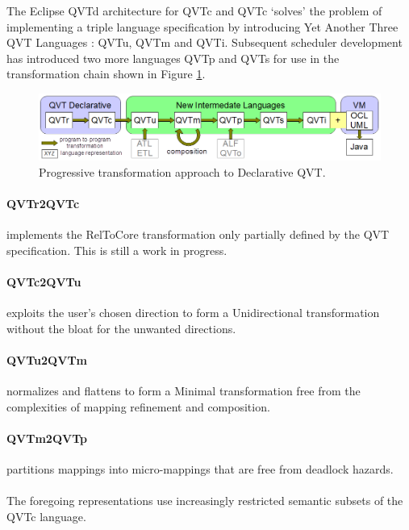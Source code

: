 \documentclass{llncs}
\begin{document}
The Eclipse QVTd architecture for QVTc and QVTc `solves' the problem of  implementing a triple language specification by introducing Yet Another Three QVT Languages\cite{ya3qvt} : QVTu, QVTm and QVTi. Subsequent scheduler development has introduced two more languages QVTp and QVTs for use in the transformation chain shown in Figure \ref{fig:architecture}.

\begin{figure}[h]
	\centering
	\includegraphics[width=1.0\textwidth]{QVThorizontalAlphabet.png}
	\caption{Progressive transformation approach to Declarative QVT.}
	\label{fig:architecture}
\end{figure}

\paragraph{QVTr2QVTc} implements the RelToCore transformation only partially defined by the QVT specification. This is still a work in progress.

\paragraph{QVTc2QVTu} exploits the user's chosen direction to form a Unidirectional transformation without the bloat for the unwanted directions.

\paragraph{QVTu2QVTm} normalizes and flattens to form a Minimal transformation free from the complexities of mapping refinement and composition.

\paragraph{QVTm2QVTp} partitions mappings into micro-mappings that are free from deadlock hazards.

\paragraph{}The foregoing representations use increasingly restricted semantic subsets of the QVTc language.
\end{document}
